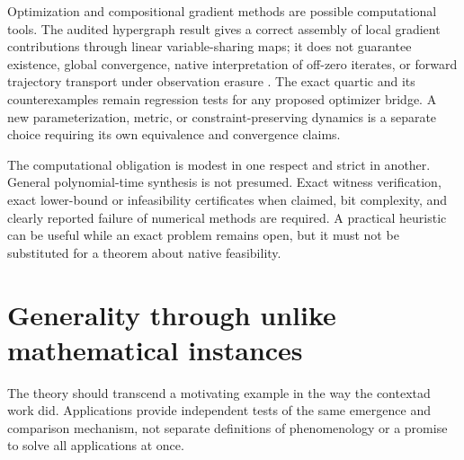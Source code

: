 \documentclass[11pt]{article}
\theoremstyle{remark}
\begin{document}
Optimization and compositional gradient methods are possible computational tools. The audited hypergraph result gives a correct assembly of local gradient contributions through linear variable-sharing maps; it does not guarantee existence, global convergence, native interpretation of off-zero iterates, or forward trajectory transport under observation erasure \cite{Budget,Interface,Hanks}. The exact quartic and its counterexamples remain regression tests for any proposed optimizer bridge. A new parameterization, metric, or constraint-preserving dynamics is a separate choice requiring its own equivalence and convergence claims.

The computational obligation is modest in one respect and strict in another. General polynomial-time synthesis is not presumed. Exact witness verification, exact lower-bound or infeasibility certificates when claimed, bit complexity, and clearly reported failure of numerical methods are required. A practical heuristic can be useful while an exact problem remains open, but it must not be substituted for a theorem about native feasibility.

\section{Generality through unlike mathematical instances}
\label{sec:generality}

The theory should transcend a motivating example in the way the contextad work did. Applications provide independent tests of the same emergence and comparison mechanism, not separate definitions of phenomenology or a promise to solve all applications at once.
\end{document}
